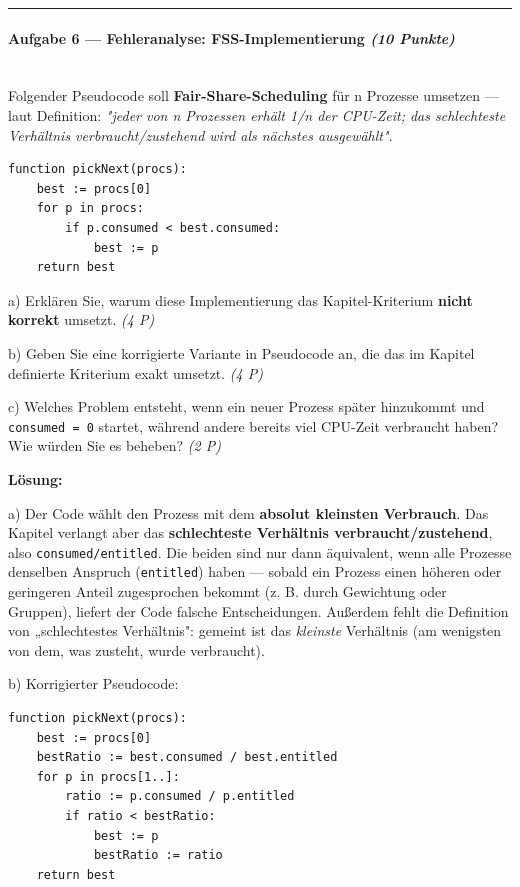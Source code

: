 \documentclass[11pt, a4paper]{article}
\begin{document}
\noindent\textcolor{rulegray}{\rule{\linewidth}{0.4pt}}


\paragraph{Aufgabe 6 — Fehleranalyse: FSS-Implementierung \textit{(10 Punkte)}}\mbox{}\\[2pt]

Folgender Pseudocode soll \textbf{Fair-Share-Scheduling} für n Prozesse umsetzen — laut Definition: \textit{"jeder von n Prozessen erhält 1/n der CPU-Zeit; das schlechteste Verhältnis verbraucht/zustehend wird als nächstes ausgewählt"}.


\begin{lstlisting}
function pickNext(procs):
    best := procs[0]
    for p in procs:
        if p.consumed < best.consumed:
            best := p
    return best
\end{lstlisting}


a) Erklären Sie, warum diese Implementierung das Kapitel-Kriterium \textbf{nicht korrekt} umsetzt. \textit{(4 P)}


b) Geben Sie eine korrigierte Variante in Pseudocode an, die das im Kapitel definierte Kriterium exakt umsetzt. \textit{(4 P)}


c) Welches Problem entsteht, wenn ein neuer Prozess später hinzukommt und \texttt{consumed = 0} startet, während andere bereits viel CPU-Zeit verbraucht haben? Wie würden Sie es beheben? \textit{(2 P)}


\textbf{Lösung:}


a) Der Code wählt den Prozess mit dem \textbf{absolut kleinsten Verbrauch}. Das Kapitel verlangt aber das \textbf{schlechteste Verhältnis verbraucht/zustehend}, also \texttt{consumed/entitled}. Die beiden sind nur dann äquivalent, wenn alle Prozesse denselben Anspruch (\texttt{entitled}) haben — sobald ein Prozess einen höheren oder geringeren Anteil zugesprochen bekommt (z. B. durch Gewichtung oder Gruppen), liefert der Code falsche Entscheidungen. Außerdem fehlt die Definition von „schlechtestes Verhältnis": gemeint ist das \textit{kleinste} Verhältnis (am wenigsten von dem, was zusteht, wurde verbraucht).


b) Korrigierter Pseudocode:


\begin{lstlisting}
function pickNext(procs):
    best := procs[0]
    bestRatio := best.consumed / best.entitled
    for p in procs[1..]:
        ratio := p.consumed / p.entitled
        if ratio < bestRatio:
            best := p
            bestRatio := ratio
    return best
\end{lstlisting}
\end{document}
